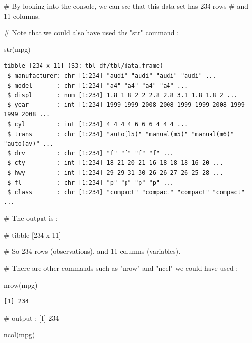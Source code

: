 \documentclass[
  letterpaper,
  DIV=11,
  numbers=noendperiod]{scrreprt}
\newenvironment{Shaded}{\begin{snugshade}}{\end{snugshade}}
\newcommand{\CommentTok}[1]{\textcolor[rgb]{0.37,0.37,0.37}{#1}}
\newcommand{\FunctionTok}[1]{\textcolor[rgb]{0.28,0.35,0.67}{#1}}
\newcommand{\NormalTok}[1]{\textcolor[rgb]{0.00,0.23,0.31}{#1}}
\begin{document}
\begin{Shaded}
\begin{Highlighting}[]
\CommentTok{\# By looking into the console, we can see that this data set has 234 rows}
\CommentTok{\# and 11 columns.}

\CommentTok{\# Note that we could also have used the "str" command :}

\FunctionTok{str}\NormalTok{(mpg)}
\end{Highlighting}
\end{Shaded}

\begin{verbatim}
tibble [234 x 11] (S3: tbl_df/tbl/data.frame)
 $ manufacturer: chr [1:234] "audi" "audi" "audi" "audi" ...
 $ model       : chr [1:234] "a4" "a4" "a4" "a4" ...
 $ displ       : num [1:234] 1.8 1.8 2 2 2.8 2.8 3.1 1.8 1.8 2 ...
 $ year        : int [1:234] 1999 1999 2008 2008 1999 1999 2008 1999 1999 2008 ...
 $ cyl         : int [1:234] 4 4 4 4 6 6 6 4 4 4 ...
 $ trans       : chr [1:234] "auto(l5)" "manual(m5)" "manual(m6)" "auto(av)" ...
 $ drv         : chr [1:234] "f" "f" "f" "f" ...
 $ cty         : int [1:234] 18 21 20 21 16 18 18 18 16 20 ...
 $ hwy         : int [1:234] 29 29 31 30 26 26 27 26 25 28 ...
 $ fl          : chr [1:234] "p" "p" "p" "p" ...
 $ class       : chr [1:234] "compact" "compact" "compact" "compact" ...
\end{verbatim}

\begin{Shaded}
\begin{Highlighting}[]
\CommentTok{\# The output is : }

\CommentTok{\# tibble [234 x 11] }

\CommentTok{\# So 234 rows (observations), and 11 columns (variables).}

\CommentTok{\# There are other commands such as "nrow" and "ncol" we could have used :}

\FunctionTok{nrow}\NormalTok{(mpg)}
\end{Highlighting}
\end{Shaded}

\begin{verbatim}
[1] 234
\end{verbatim}

\begin{Shaded}
\begin{Highlighting}[]
\CommentTok{\# output : [1] 234}

\FunctionTok{ncol}\NormalTok{(mpg)}
\end{Highlighting}
\end{Shaded}
\end{document}

